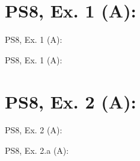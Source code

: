 \section{PS8, Ex. 1 (A): }

\begin{frame}{PS8, Ex. 1 (A): }
    \begin{multicols}{2}
      \vfill\null\columnbreak
      \vfill\null
    \end{multicols}
\end{frame}

\begin{frame}{PS8, Ex. 1 (A): }
    \begin{multicols}{2}
      \vfill\null\columnbreak
      \vfill\null
    \end{multicols}
\end{frame}



\section{PS8, Ex. 2 (A): }

\begin{frame}{PS8, Ex. 2 (A): }
    \begin{multicols}{2}
      \vfill\null\columnbreak
      \vfill\null
    \end{multicols}
\end{frame}

\begin{frame}{PS8, Ex. 2.a (A): }
    \begin{multicols}{2}
      \vfill\null\columnbreak
      \vfill\null
    \end{multicols}
\end{frame}
